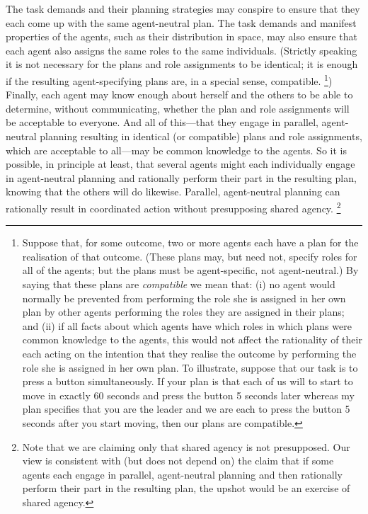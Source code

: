 \documentclass[12pt,\papersize]{extarticle}
\begin{document}
  
	The task demands and their planning strategies may conspire to ensure that they each come up with the same agent-neutral plan.
	The task demands and manifest properties of the agents, such as their distribution in space, may also ensure that each agent also assigns the same roles to the same individuals.
(Strictly speaking it is not necessary for the plans and role assignments to be identical; it is enough if the resulting agent-specifying plans are, in a special sense, compatible.%
\footnote{
\label{fn:df_compatible}
Suppose that, for some outcome, two or more agents each have a plan for the realisation of that outcome. 
(These plans may, but need not, specify roles for all of the agents; but the plans must be agent-specific, not agent-neutral.)
By saying that these plans are \emph{compatible} we mean that:
(i) 
no agent would normally be prevented from performing the role she is assigned in her own plan by other agents performing the roles they are assigned in their plans;
and
(ii)
if all facts about which agents have which roles in which plans were common knowledge to the agents,
this would not affect the rationality of their each acting on the intention that they realise the outcome by performing the role she is assigned in her own plan.
To illustrate, suppose that our task is to press a button simultaneously. 
If your plan is that each of us will to start to move in exactly 60 seconds and press the button 5 seconds later whereas my plan specifies that you are the leader and we are each to press the button 5 seconds after you start moving, then our plans are compatible.
})
%
Finally, each agent may know enough about herself and the others to be able to determine, without communicating, whether the plan and role assignments will be acceptable to everyone. 
	And all of this---that they engage in parallel, agent-neutral planning resulting in identical (or compatible) plans and role assignments, which are acceptable to all---may be common knowledge to the agents.
	So it is possible, in principle at least, 
	that several agents might each individually engage in agent-neutral planning and rationally perform their part in the resulting plan, knowing that the others will do likewise.
	Parallel, agent-neutral planning can rationally result in coordinated action without presupposing shared agency.%
\footnote{
Note that we are claiming only that shared agency is not presupposed.
Our view is consistent with (but does not depend on) the claim
that
	if some agents each engage in parallel, agent-neutral planning and then rationally perform their part in the resulting plan,
	the upshot would be an exercise of shared agency.
}
\end{document}
